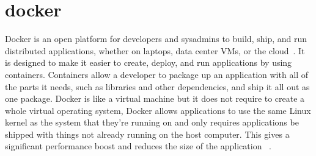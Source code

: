 \section{docker}
Docker is an open platform for developers and sysadmins to build, ship, 
and run distributed applications, whether on laptops, data center VMs, 
or the cloud~\cite{hid-sp18-513-docker}. It is designed to make it easier to
create, deploy, and run applications by using containers. Containers allow a 
developer to package up an application with all of the parts it needs, 
such as libraries and other dependencies, and ship it all out as one package. 
Docker is like a virtual machine but it does not require to create a whole 
virtual operating system, Docker allows applications to use the same Linux 
kernel as the system that they're running on and only requires applications 
be shipped with things not already running on the host computer. This gives 
a significant performance boost and reduces the size of the application 
~\cite{hid-sp18-513-opensource}.


